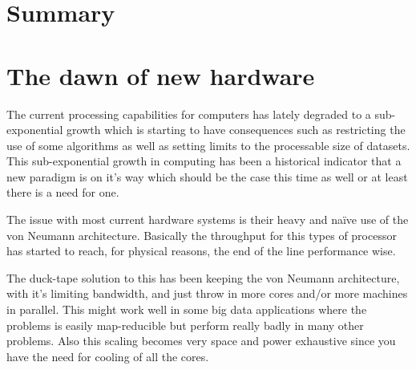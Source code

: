 \documentclass{article}
\begin{document}

%
% 


\section{Summary}

\section{The dawn of new hardware}
    The current processing capabilities for computers has lately degraded to a
    sub-exponential growth which is starting to have consequences such as 
    restricting the use of some algorithms as well as setting limits 
    to the processable size of datasets.
    This sub-exponential growth in computing has been a historical indicator
    that a new paradigm is on it's way which should be the case this time as
    well or at least there is a need for one.%
    
    The issue with most current hardware systems is their heavy and na\"{i}ve use of the von
    Neumann architecture. Basically the throughput for this types of processor
    has started to reach, for physical reasons, the end of the line 
    performance wise.

    The duck-tape solution to this has been keeping the von Neumann
    architecture, with it's limiting bandwidth, and just throw in more cores and/or more machines in parallel.
    This might work well in some big data applications where the problems is easily
    map-reducible but perform really badly in many other
    problems.\cite{mapreduce} Also
    this scaling becomes very space and power exhaustive since you have the need for
    cooling of all the cores. 
\end{document}
